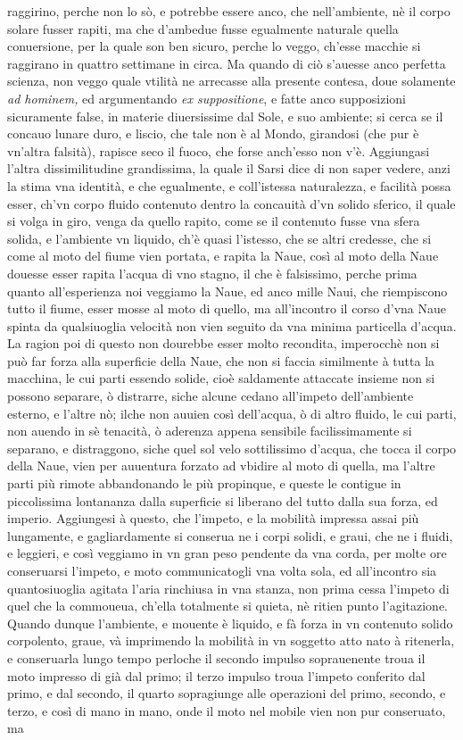 \documentclass[11pt,twoside,openany]{book}
\begin{document}
raggirino, perche non lo sò, e potrebbe essere anco, che nell'ambiente, nè il corpo solare fusser rapiti, ma che d'ambedue fusse egualmente naturale quella conuersione, per la quale son ben sicuro, perche lo veggo, ch'esse macchie si raggirano in quattro settimane in circa. Ma quando di ciò s'auesse anco perfetta scienza, non veggo quale vtilità ne arrecasse alla presente contesa, doue solamente \textit{ad hominem,} ed argumentando \textit{ex suppositione}, e fatte anco supposizioni sicuramente false, in materie diuersissime dal Sole, e suo ambiente; si cerca se il concauo lunare duro, e liscio, che tale non è al Mondo, girandosi (che pur è vn'altra falsità), rapisce seco il fuoco, che forse anch'esso non v'è. Aggiungasi l'altra dissimilitudine grandissima, la quale il Sarsi dice di non saper vedere, anzi la stima vna identità, e che egualmente, e coll'istessa naturalezza, e facilità possa esser, ch'vn corpo fluido contenuto dentro la concauità d'vn solido sferico, il quale si volga in giro, venga da quello rapito, come se il contenuto fusse vna sfera solida, e l'ambiente vn liquido, ch'è quasi l'istesso, che se altri credesse, che si come al moto del fiume vien portata, e rapita la Naue, così al moto della Naue douesse esser rapita l'acqua di vno stagno, il che è falsissimo, perche prima quanto all'esperienza noi veggiamo la Naue, ed anco mille Naui, che riempiscono tutto il fiume, esser mosse al moto di quello, ma all'incontro il corso d'vna Naue spinta da qualsiuoglia velocità non vien seguito da vna minima particella d'acqua. La ragion poi di questo non dourebbe esser molto recondita, imperocchè non si può far forza alla superficie della Naue, che non si faccia similmente à tutta la macchina, le cui parti essendo solide, cioè saldamente attaccate insieme non si possono separare, ò distrarre, siche alcune cedano all'impeto dell'ambiente esterno, e l'altre nò; ilche non auuien così dell'acqua, ò di altro fluido, le cui parti, non auendo in sè tenacità, ò aderenza appena sensibile facilissimamente si separano, e distraggono, siche quel sol velo sottilissimo d'acqua, che tocca il corpo della Naue, vien per auuentura forzato ad vbidire al moto di quella, ma l'altre parti più rimote abbandonando le più propinque, e queste le contigue in piccolissima lontananza dalla superficie si liberano del tutto dalla sua forza, ed imperio. Aggiungesi à questo, che l'impeto, e la mobilità impressa assai più lungamente, e gagliardamente si conserua ne i corpi solidi, e graui, che ne i fluidi, e leggieri, e così veggiamo in vn gran peso pendente da vna corda, per molte ore conseruarsi l'impeto, e moto communicatogli vna volta sola, ed all'incontro sia quantosiuoglia agitata l'aria rinchiusa in vna stanza, non prima cessa l'impeto di quel che la commoueua, ch'ella totalmente si quieta, nè ritien punto l'agitazione. Quando dunque l'ambiente, e mouente è liquido, e fà forza in vn contenuto solido corpolento, graue, và imprimendo la mobilità in vn soggetto atto nato à ritenerla, e conseruarla lungo tempo perloche il secondo impulso soprauenente troua il moto impresso di già dal primo; il terzo impulso troua l'impeto conferito dal primo, e dal secondo, il quarto sopragiunge alle operazioni del primo, secondo, e terzo, e così di mano in mano, onde il moto nel mobile vien non pur conseruato, ma 
\end{document}
